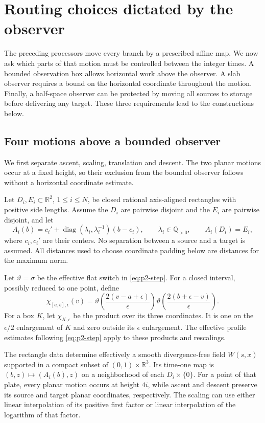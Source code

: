 \section{Routing choices dictated by the observer}
\label{ba:ordered-routes}

The preceding processors move every branch by a prescribed affine map.
We now ask which parts of that motion must be controlled between the
integer times.  A bounded observation box allows horizontal work above
the observer.  A slab observer requires a bound on the horizontal
coordinate throughout the motion.  Finally, a half-space observer can be
protected by moving all sources to storage before delivering any target.
These three requirements lead to the constructions below.

\subsection{Four motions above a bounded observer}
\label{ba:four-stage-section}

We first separate ascent, scaling, translation and descent.  The two
planar motions occur at a fixed height, so their exclusion from the
bounded observer follows without a horizontal coordinate estimate.

Let $D_i,E_i\subset\mathbb R^2$, $1\le i\le N$, be closed rational
axis-aligned rectangles with positive side lengths.  Assume the $D_i$
are pairwise disjoint and the $E_i$ are pairwise disjoint, and let
\[
 A_i(b)=c_i'+\operatorname{diag}(\lambda_i,\lambda_i^{-1})(b-c_i),
 \qquad \lambda_i\in\mathbb Q_{>0},\qquad A_i(D_i)=E_i,
\]
where $c_i,c_i'$ are their centers.  No separation between a source and
a target is assumed.  All distances used to choose coordinate padding
below are distances for the maximum norm.

Let $\vartheta=\sigma$ be the effective flat switch in
\eqref{eq:p2-step}.  For a closed interval, possibly reduced to one
point, define
\[
 \chi_{[a,b],\epsilon}(v)=
 \vartheta\!\left(\frac{2(v-a+\epsilon)}\epsilon\right)
 \vartheta\!\left(\frac{2(b+\epsilon-v)}\epsilon\right).
\]
For a box $K$, let $\chi_{K,\epsilon}$ be the product over its three
coordinates.  It is one on the $\epsilon/2$ enlargement of $K$ and
zero outside its $\epsilon$ enlargement.  The effective profile estimates
following \eqref{eq:p2-step} apply to these products and rescalings.

\begin{lemma}\label{ba:four-stage}
The rectangle data determine effectively a smooth divergence-free field
$W(s,x)$ supported in a compact subset of $(0,1)\times\mathbb R^3$.
Its time-one map is $(b,z)\mapsto(A_i(b),z)$ on a neighborhood of
each $D_i\times\{0\}$.  For a point of that plate, every planar
motion occurs at height $4i$, while ascent and descent preserve its
source and target planar coordinates, respectively.  The scaling can
use either linear interpolation of its positive first factor or linear
interpolation of the logarithm of that factor.
\end{lemma}

